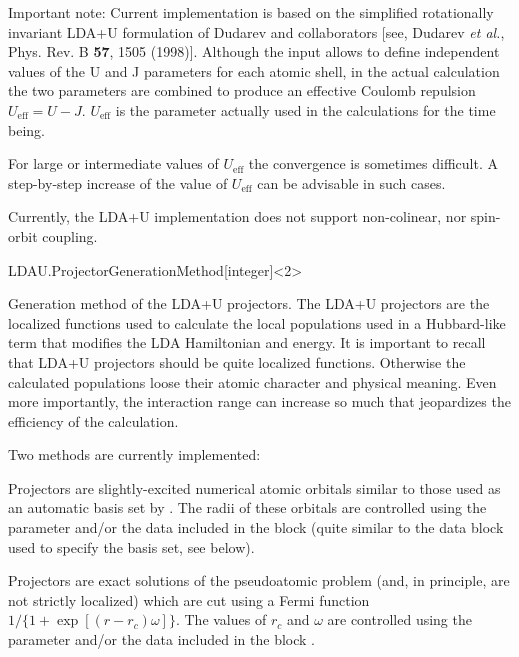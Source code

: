 Important note: Current implementation is based on the simplified
rotationally invariant LDA+U formulation of Dudarev and collaborators
[see, Dudarev \textit{et al.}, Phys. Rev. B \textbf{57}, 1505 (1998)].
Although the input allows to define independent values of the U and J
parameters for each atomic shell, in the actual calculation the two
parameters are combined to produce an effective Coulomb repulsion
$U_{\mathrm{eff}}=U-J$. $U_{\mathrm{eff}}$ is the parameter actually
used in the calculations for the time being.

For large or intermediate values of $U_{\mathrm{eff}}$ the convergence
is sometimes difficult. A step-by-step increase of the
value of $U_{\mathrm{eff}}$ can be advisable in such cases.

Currently, the LDA+U implementation does not support non-colinear, nor
spin-orbit coupling.

\begin{fdfentry}{LDAU.ProjectorGenerationMethod}[integer]<2>
  
  Generation method of the LDA+U projectors. The LDA+U projectors are
  the localized functions used to calculate the local populations used
  in a Hubbard-like term that modifies the LDA Hamiltonian and
  energy. It is important to recall that LDA+U projectors should be
  quite localized functions.  Otherwise the calculated populations
  loose their atomic character and physical meaning. Even more
  importantly, the interaction range can increase so much that
  jeopardizes the efficiency of the calculation.

  Two methods are currently implemented:
  \begin{fdfoptions}
    \option[1]%
    Projectors are slightly-excited numerical atomic orbitals similar
    to those used as an automatic basis set by \siesta.  The radii of
    these orbitals are controlled using the parameter
     and/or the data included in the block
     (quite similar to the data block 
    used to specify the basis set, see below).

    \option[2]%
    Projectors are exact solutions of the pseudoatomic problem (and,
    in principle, are not strictly localized) which are cut using a
    Fermi function $1/\{1+\exp[(r-r_c)\omega]\}$.  The values of $r_c$
    and $\omega$ are controlled using the parameter 
    and/or the data included in the block .

  \end{fdfoptions}

\end{fdfentry}

